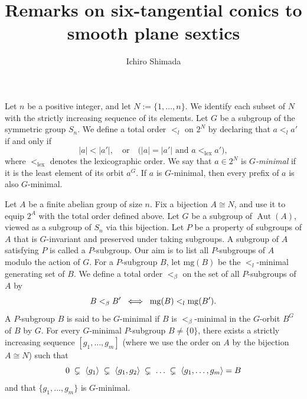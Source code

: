 \documentclass{amsart} %
\begin{document}
%
\title{Remarks on  six-tangential conics to smooth plane sextics} 
\author{Ichiro Shimada}
\address{Department of Mathematics,
Graduate School of Science,
Hiroshima University,
1-3-1 Kagamiyama,
Higashi-Hiroshima,
739-8526 JAPAN}
%
%

%
\begin{abstract}
\end{abstract}
%

\keywords{}
\maketitle

\newcommand{\mingen}{\mathrm{mg}}
%
Let $n$ be a positive integer, and let $N := \{1,\ldots,n\}$.
We identify each subset of $N$ with the strictly increasing sequence
of its elements.
Let $G$ be a subgroup of the symmetric group $S_n$.
We define a total order $<_{l}$ on $2^N$ by declaring that $a <_{l} a'$ if and only if
\[
|a| < |a'|,
\quad\text{or}\quad
\bigl(|a| = |a'| \text{ and } a <_{\mathrm{lex}} a'\bigr),
\]
where $<_{\mathrm{lex}}$ denotes the lexicographic order.
We say that $a \in 2^N$ is \emph{$G$-minimal} if it is the least
element of its orbit $a^G$.
If $a$ is $G$-minimal, then every prefix of $a$ is also $G$-minimal.

Let $A$ be a finite abelian group of size $n$.
Fix a bijection $A \cong N$, and use it to equip $2^A$ with the
total order defined above.
Let $G$ be a subgroup of $\operatorname{Aut}(A)$, viewed as a
subgroup of $S_n$ via this bijection.
Let $P$ be a property of subgroups of $A$ that is $G$-invariant
and preserved under taking subgroups.
A subgroup of $A$ satisfying $P$ is called a $P$-subgroup.
Our aim is to list all  $P$-subgroups of $A$  modulo the action of $G$.
For a $P$-subgroup $B$,
 let $\mingen(B)$ be the $<_{l}$-minimal  generating set  of  $B$.
 We define a total order $<_{\beta}$ on the set of all  $P$-subgroups of $A$ 
 by 
 \[
 B<_{\beta}B\sprime\;\;  \Longleftrightarrow \;\;\mingen(B)<_{l} \mingen(B\sprime).
 \]
A $P$-subgroup $B$ is said to be $G$-minimal 
if $B$ is $<_{\beta}$-minimal  in 
 the $G$-orbit $B^G$ of $B$ by $G$.
For every $G$-minimal $P$-subgroup $B\ne \{0\}$,
there exists   a  strictly  increasing sequence $[g_1, \dots, g_m]$  (where we use the order on $A$ by the bijection $A \cong N$) such that 
\[
0\;\subsetneq\; \langle {g_1} \rangle\;\subsetneq\; \langle {g_1, g_2} \rangle\;\subsetneq\; \dots \;\subsetneq\; \langle {g_1, \dots, g_m} \rangle=B
\]
and that $\{g_1, \dots, g_m\}$ is $G$-minimal.
%
%
%
\end{document}
